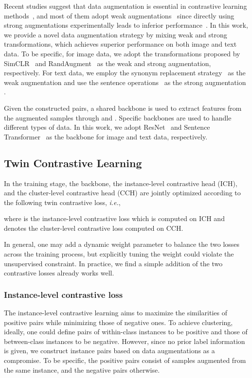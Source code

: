 Recent studies suggest that data augmentation is essential in contrastive learning methods~\citep{SimCLR, SWAV}, and most of them adopt weak augmentations~\citep{SimCLR, BYOL, BarlowTwins} since directly using strong augmentations experimentally leads to inferior performance~\citep{StrongContrastive}. In this work, we provide a novel data augmentation strategy by mixing weak and strong transformations, which achieves superior performance on both image and text data. To be specific, for image data, we adopt the transformations proposed by SimCLR~\citep{SimCLR} and RandAugment~\citep{RandAug} as the weak  and strong  augmentation, respectively. For text data, we employ the synonym replacement strategy~\citep{SCCL} as the weak augmentation  and use the sentence operations~\citep{EDA} as the strong augmentation .

Given the constructed pairs, a shared backbone  is used to extract features  from the augmented samples through  and . Specific backbones are used to handle different types of data. In this work, we adopt ResNet~\citep{ResNet} and Sentence Transformer~\citep{SentenceTransformer} as the backbone for image and text data, respectively.

\subsection{Twin Contrastive Learning}

In the training stage, the backbone, the instance-level contrastive head (ICH), and the cluster-level contrastive head (CCH) are jointly optimized according to the following twin contrastive loss, \textit{i.e.},

where  is the instance-level contrastive loss which is computed on ICH and  denotes the cluster-level contrastive loss computed on CCH.

In general, one may add a dynamic weight parameter to balance the two losses across the training process, but explicitly tuning the weight could violate the unsupervised constraint. In practice, we find a simple addition of the two contrastive losses already works well.

\subsubsection{Instance-level contrastive loss}

The instance-level contrastive learning aims to maximize the similarities of positive pairs while minimizing those of negative ones. To achieve clustering, ideally, one could define pairs of within-class instances to be positive and those of between-class instances to be negative. However, since no prior label information is given, we construct instance pairs based on data augmentations as a compromise. To be specific, the positive pairs consist of samples augmented from the same instance, and the negative pairs otherwise.

